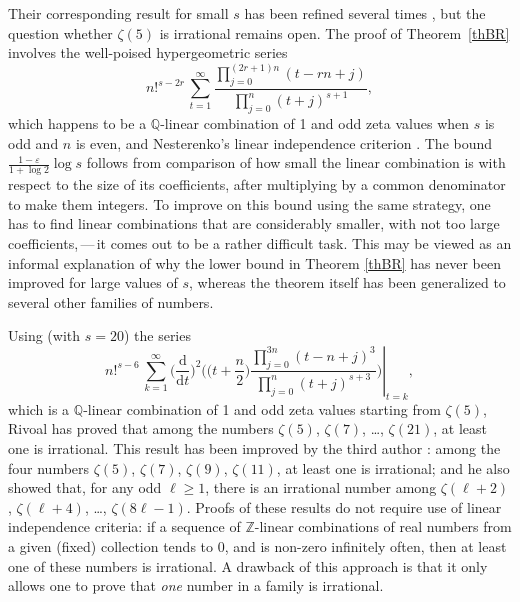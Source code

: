 \documentclass{article}
\numberwithin{equation}{section}
\theoremstyle{remark}
\newcommand{\eps}{\varepsilon}
\newcommand{\Z}{\mathbb{Z}}
\newcommand{\Q}{\mathbb{Q}}
\renewcommand{\d}{\mathrm{d}}
\begin{document}
Their corresponding result for small $s$ has been refined several times \cite{Zudilincentqc, SFZu}, 
but  the question whether $\zeta(5)$ is irrational remains open.
The proof of Theorem~\ref{thBR} involves the well-poised hypergeometric series
\begin{equation}\label{eqBR}
n!^{s-2r}\, \sum_{t=1}^\infty \frac{ \prod_{j=0}^{ (2r+1)n} (t-rn+j) }{ \prod_{j=0}^{ n} (t+j)^{s+1}},
\end{equation}
which happens to be a $\Q$-linear combination of 1 and odd zeta values when $s$ is odd and $n$ is even, and Nesterenko's linear independence criterion \cite{Nesterenkocritere}. The bound $\frac{1-\eps}{1+\log 2}\log s$ follows from comparison of how small the linear combination is with respect to the size of its coefficients, after multiplying by a common denominator to make them integers. To improve on this bound using the same strategy, one has to find linear combinations that are considerably smaller, with not too large coefficients,\,---\,it comes out to be a rather difficult task. This may be viewed as
an informal explanation of why the lower bound in Theorem \ref{thBR} has never been improved for large values of $s$, whereas the theorem itself has been generalized to several other families of numbers.


\bigskip

Using (with $s=20$) the series 
$$n!^{s-6}\,  \sum_{k=1}^\infty \left.\Big( \frac{\d}{\d t}\Big)^2 \bigg( \Big(t+\frac{n}{2}\Big) \frac{\prod_{j=0}^{ 3n} (t-n+j)^3 }{ \prod_{j=0}^{ n} (t+j)^{s+3}}\bigg)\right|_{t=k} ,$$
which is a $\Q$-linear combination of 1 and odd zeta values starting from $\zeta(5)$, Rivoal has proved \cite{vingtetun} that among the numbers $\zeta(5)$, $\zeta(7)$, \ldots, $\zeta(21)$, at least one is irrational. This result has been improved by the third author \cite{Zudilinonze}: among the four numbers $\zeta(5)$, $\zeta(7)$, $\zeta(9)$, $\zeta(11)$, at least one is irrational; and he also showed \cite{Zudilincentqc} that, for any odd $\ell \geq 1$, there is an irrational number among $\zeta(\ell+2)$, $\zeta(\ell+4)$, \ldots, $\zeta(8\ell-1)$.
Proofs of these results do not require use of linear independence criteria: if a sequence of $\Z$-linear combinations of real numbers from a given (fixed) collection tends to 0, and is non-zero infinitely often, then at least one of these numbers is irrational. A drawback of this approach is that it only allows one to prove that {\em one} number in a family is irrational.

\bigskip
\end{document}
